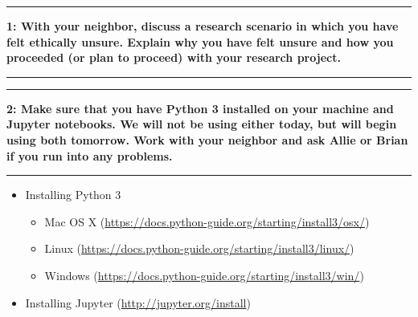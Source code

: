 \documentclass[11pt]{article}
\newcommand\question[2]{\vspace{.25in}\hrule\textbf{#1: #2}\vspace{.5em}\hrule\vspace{.10in}}
\begin{document}
\raggedright
\newcommand\NAME{Allie Morgan} 

\vspace{-0.2 in}
\question{1}{With your neighbor, discuss a research scenario in which you have felt ethically unsure. Explain why you have felt unsure and how you proceeded (or plan to proceed) with your research project.} 
\vspace{1 in}
\question{2}{Make sure that you have Python 3 installed on your machine and Jupyter notebooks. We will not be using either today, but will begin using both tomorrow. Work with your neighbor and ask Allie or Brian if you run into any problems.} 
\begin{itemize}
\item Installing Python 3
  \begin{itemize}
    \item Mac OS X (\href{https://docs.python-guide.org/starting/install3/osx/}{https://docs.python-guide.org/starting/install3/osx/})
    \item Linux (\href{https://docs.python-guide.org/starting/install3/linux/}{https://docs.python-guide.org/starting/install3/linux/})
    \item Windows (\href{https://docs.python-guide.org/starting/install3/win/}{https://docs.python-guide.org/starting/install3/win/})
  \end{itemize}
  
\item Installing Jupyter (\href{http://jupyter.org/install}{http://jupyter.org/install})
\end{itemize}
\end{document}

